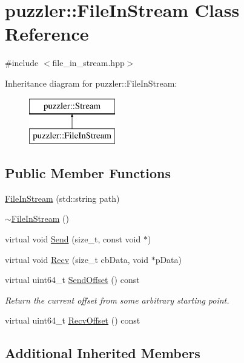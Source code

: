 \hypertarget{a00007}{}\section{puzzler\+:\+:File\+In\+Stream Class Reference}
\label{a00007}


{\ttfamily \#include $<$file\+\_\+in\+\_\+stream.\+hpp$>$}

Inheritance diagram for puzzler\+:\+:File\+In\+Stream\+:\begin{figure}[H]
\begin{center}
\leavevmode
\includegraphics[height=2.000000cm]{a00007}
\end{center}
\end{figure}
\subsection*{Public Member Functions}
\begin{DoxyCompactItemize}
\item 
\hyperlink{a00007_acfaf3def7f47528386b0fdd39c5a383b}{File\+In\+Stream} (std\+::string path)
\item 
\hyperlink{a00007_a6e662f5054dcfbdbc65211396c7b1e37}{$\sim$\+File\+In\+Stream} ()
\item 
virtual void \hyperlink{a00007_a7a6810fd6cc188a04c1c848daced9aed}{Send} (size\+\_\+t, const void $\ast$)
\item 
virtual void \hyperlink{a00007_a28c190f98fc33a13b0b791e7b1213152}{Recv} (size\+\_\+t cb\+Data, void $\ast$p\+Data)
\item 
virtual uint64\+\_\+t \hyperlink{a00007_a53da1c9f93b83116a491ed3db5550802}{Send\+Offset} () const 
\begin{DoxyCompactList}\small\item\em Return the current offset from some arbitrary starting point. \end{DoxyCompactList}\item 
virtual uint64\+\_\+t \hyperlink{a00007_a61be8ee8fd10a704690f64bf3f87bbb7}{Recv\+Offset} () const 
\end{DoxyCompactItemize}
\subsection*{Additional Inherited Members}


